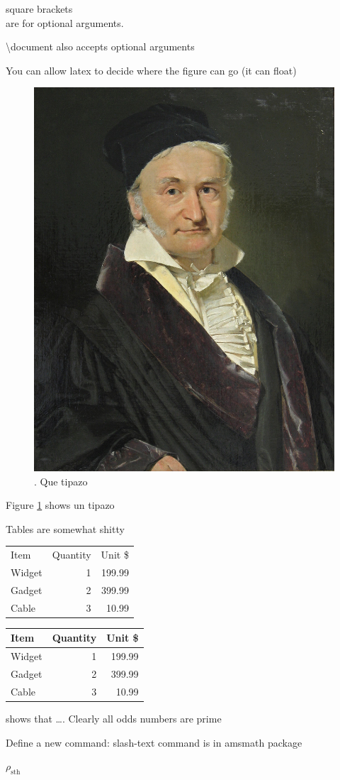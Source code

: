 \documentclass{article}
\begin{document}
square brackets \[ \] are for optional arguments.

\textbackslash document also accepts optional arguments

You can allow latex to decide where the figure can go (it can float)

\begin{figure}
\centering
    \includegraphics[width=.5\textwidth]{gauss.jpeg}
\caption{\label{fig:gauss}. Que tipazo}
\end{figure}

Figure \ref{fig:gauss} shows un tipazo

Tables are somewhat shitty

\begin{tabular}{lrr} %
Item    & Quantity  & Unit \$   \\
Widget  & 1         & 199.99    \\
Gadget  & 2         & 399.99    \\
Cable   & 3         & 10.99     \\
\end{tabular}

\begin{tabular}{|l|r|r|} \hline %
Item    & Quantity  & Unit \$   \\\hline
Widget  & 1         & 199.99    \\
Gadget  & 2         & 399.99    \\
Cable   & 3         & 10.99     \\\hline
\end{tabular}



\citet{Brooks1997Methodology} shows that \ldots. Clearly all odds numbers
are prime \citep{Jacobson1999Towards}

Define a new command: slash-text command is in amsmath package
\newcommand{\rperf}{\rho_{\text{sth}}}

$\rperf$




\end{document}
